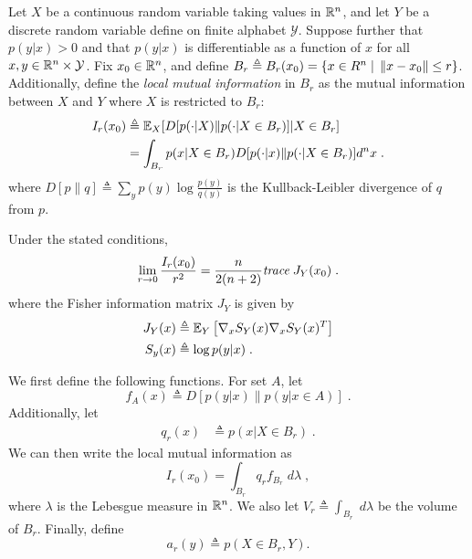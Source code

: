 \documentclass[english]{scrartcl}
\begin{document}
	Let $X$ be a continuous random variable taking values in $\mathbb{R}^n$, and let $Y$ be a discrete random variable define on finite alphabet $\mathcal{Y}$. Suppose further that $p(y|x) > 0$ and that $p(y|x)$ is differentiable as a function of $x$ for all $x,y \in \mathbb{R}^n \times \mathcal{Y}$. Fix $x_0 \in \mathbb{R}^n$, and define $B_r \triangleq B_r(x_0) = \{ x \in R^n \;|\; \left\lVert x - x_0\right\rVert \leq r \}$. Additionally, define the \emph{local mutual information} in $B_r$ as the mutual information between $X$ and $Y$ where $X$ is restricted to $B_r$:
		\begin{align*}
			I_r(x_0) &\triangleq \mathbb{E}_X[D[p(\cdot|X)\| p(\cdot|X \in B_r)]|X \in B_r] \\
			&= \int_{B_r} p(x|X \in B_r) D[p(\cdot|x)\| p(\cdot|X \in B_r)] d^n x\;.
		\end{align*}
		where $D[p\|q] \triangleq \sum_{y} p(y) \log \frac{p(y)}{q(y)}$ is the Kullback-Leibler divergence of $q$ from $p$. 

		\begin{thm} \label{thm1}
			Under the stated conditions, 
			\begin{equation*}
				\lim_{r\rightarrow 0} \frac{I_r(x_0)}{r^2} = \frac{n}{2(n+2)} \emph{trace}\; J_Y(x_0)\;.
			\end{equation*}
			where the Fisher information matrix $J_Y$ is given by 
			\begin{align*}
			J_Y(x) &\triangleq \mathbb{E}_Y\left[\nabla_x S_{Y}(x)\nabla_x S_{Y}(x)^T \right] \\
			S_y(x) &\triangleq \log p(y|x)\;.
		\end{align*}
		\end{thm}

	We first define the following functions. For set $A$, let 
	\begin{equation*}
		f_A(x) \triangleq  D[p(y|x) \| p(y|x\in A)] \;.
	\end{equation*}
	Additionally, let 
	\begin{align*}
		q_r(x) &\triangleq p(x|X \in B_r)\;.
	\end{align*}
	We can then write the local mutual information as 
	\begin{equation*}
		I_r(x_0) = \int_{B_r} q_r f_{B_r} \; d\lambda\;,
	\end{equation*}
	where $\lambda$ is the Lebesgue measure in $\mathbb{R}^n$. We also let $V_r \triangleq \int_{B_r} \; d\lambda$ be the volume of $B_r$. Finally, define 
	\begin{equation*}
		a_r(y) \triangleq p(X \in B_r, Y). 
	\end{equation*}
\end{document}
